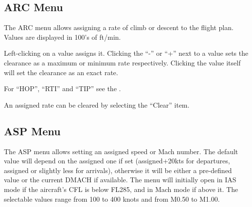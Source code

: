 \documentclass[a4paper,oneside,11pt]{memoir}
\begin{document}
\subsection{ARC Menu}
\label{menu:arc}


The ARC menu allows assigning a rate of climb or descent to the flight plan. Values are displayed in 100’s of ft/min.

\bigskip

Left-clicking on a value assigns it. Clicking the “-” or “+” next to a value sets the clearance as a maximum or minimum rate respectively. Clicking the value itself will set the clearance as an exact rate.

\bigskip

For “HOP”, “RTI” and “TIP” see the .

\bigskip

An assigned rate can be cleared by selecting the “Clear” item.


\subsection{ASP Menu}
\label{menu:asp}

\begin{center}
  \begin{minipage}[b]{0.14\textwidth}\end{minipage}\hfill 
  \begin{minipage}[b]{0.14\textwidth}\end{minipage}\hfill 
  \begin{minipage}[b]{0.14\textwidth}\end{minipage}\hfill  
  \begin{minipage}[b]{0.14\textwidth}\end{minipage}\hfill 
\end{center} 

\bigskip

The ASP menu allows setting an assigned speed or Mach number. The default value will depend on the assigned one if set (assigned+20kts for departures, assigned or slightly less for arrivals), otherwise it will be either a pre-defined value or the current DMACH if available. The menu will initially open in IAS mode if the aircraft’s CFL is below FL285, and in Mach mode if above it. The selectable values range from 100 to 400 knots and from M0.50 to M1.00.
\end{document}
